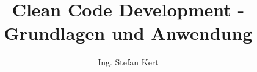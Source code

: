 \documentclass[bachelor,german]{hgbthesis}
\begin{document}
\title{Clean Code Development - Grundlagen und Anwendung}
\author{Ing. Stefan Kert}
\frontmatter
\maketitle
\tableofcontents

		
			

\mainmatter 










\appendix

\MakeBibliography
\end{document}

